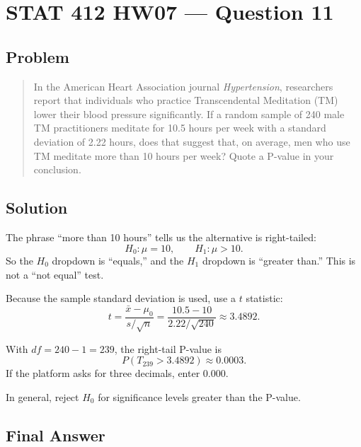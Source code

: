 \documentclass[11pt]{article}
\begin{document}
\section*{STAT 412 HW07 --- Question 11}

\subsection*{Problem}

\begin{quote}
In the American Heart Association journal \textit{Hypertension}, researchers report that individuals who practice Transcendental Meditation (TM) lower their blood pressure significantly. If a random sample of 240 male TM practitioners meditate for 10.5 hours per week with a standard deviation of 2.22 hours, does that suggest that, on average, men who use TM meditate more than 10 hours per week? Quote a P-value in your conclusion.
\end{quote}

\subsection*{Solution}

The phrase ``more than 10 hours'' tells us the alternative is right-tailed:
\[
H_0:\mu=10,\qquad H_1:\mu>10.
\]
So the $H_0$ dropdown is ``equals,'' and the $H_1$ dropdown is ``greater than.'' This is not a ``not equal'' test.

Because the sample standard deviation is used, use a $t$ statistic:
\[
t=\frac{\bar{x}-\mu_0}{s/\sqrt{n}}
  =\frac{10.5-10}{2.22/\sqrt{240}}
  \approx 3.4892.
\]

With $df=240-1=239$, the right-tail P-value is
\[
P(T_{239}>3.4892)\approx 0.0003.
\]
If the platform asks for three decimals, enter $0.000$.

In general, reject $H_0$ for significance levels greater than the P-value.

\subsection*{Final Answer}

\end{document}

